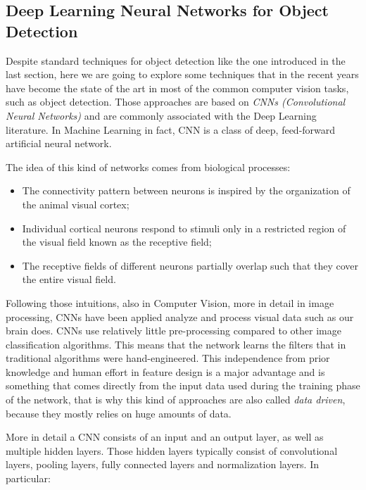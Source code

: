 \subsection{Deep Learning Neural Networks for Object Detection}\label{subsec:dl_obj_detection}
Despite standard techniques for object detection like the one introduced in the last section, here we are going to explore some techniques that in the recent years have become the state of the art in most of the common computer vision tasks, such as object detection. Those approaches are based on \emph{CNNs (Convolutional Neural Networks)} and are commonly associated with the Deep Learning literature. In Machine Learning in fact, CNN is a class of deep, feed-forward artificial neural network. 

The idea of this kind of networks comes from biological processes: 

\begin{itemize}
	\item The connectivity pattern between neurons is inspired by the organization of the animal visual cortex; 	
	\item Individual cortical neurons respond to stimuli only in a restricted region of the visual field known as the receptive field; 
	\item The receptive fields of different neurons partially overlap such that they cover the entire visual field.
\end{itemize}

Following those intuitions, also in Computer Vision, more in detail in image processing, CNNs have been applied analyze and process visual data such as our brain does. CNNs use relatively little pre-processing compared to other image classification algorithms. This means that the network learns the filters that in traditional algorithms were hand-engineered. This independence from prior knowledge and human effort in feature design is a major advantage and is something that comes directly from the input data used during the training phase of the network, that is why this kind of approaches are also called \emph{data driven}, because they mostly relies on huge amounts of data.

More in detail a CNN consists of an input and an output layer, as well as multiple hidden layers. Those hidden layers typically consist of convolutional layers, pooling layers, fully connected layers and normalization layers. In particular:

